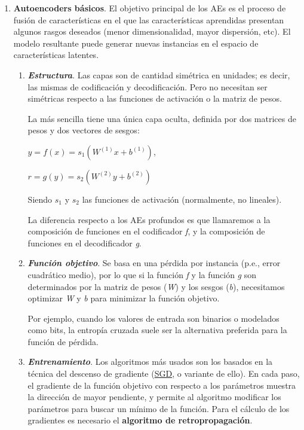 \begin{enumerate}
    \begin{enumerate}
        \item \textbf{Autoencoders básicos}. El objetivo principal de los AEs es el proceso de fusión de características en el que las características aprendidas presentan algunos rasgos deseados (menor dimensionalidad, mayor dispersión, etc). El modelo resultante puede generar nuevas instancias en el espacio de características latentes.
        \begin{enumerate}
            \item \textit{\textbf{Estructura}}. Las capas son de cantidad simétrica en unidades; es decir, las mismas de codificación y decodificación. Pero no necesitan ser simétricas respecto a las funciones de activación o la matriz de pesos.
            
            La más sencilla tiene una única capa oculta, definida por dos matrices de pesos y dos vectores de sesgos:
            \begin{center}
                $y = f(x) = s_{1} (W^{(1)}x + b^{(1)})$,
                
                $r = g (y) = s_{2} (W^{(2)}y + b^{(2)} )$
            \end{center}
            
            Siendo $s_{1}$ y $s_{2}$ las funciones de activación (normalmente, no lineales).
            
            La diferencia respecto a los AEs profundos es que llamaremos a la composición de funciones en el codificador \textit{f}, y la composición de funciones en el decodificador \textit{g}.
            
            \item \textit{\textbf{Función objetivo}}. Se basa en una pérdida por instancia (p.e., error cuadrático medio), por lo que si la función \textit{f} y la función \textit{g} son determinados por la matriz de pesos (\textit{W}) y los sesgos (\textit{b}), necesitamos optimizar \textit{W} y \textit{b} para minimizar la función objetivo.
            
            Por ejemplo, cuando los valores de entrada son
            binarios o modelados como bits, la entropía cruzada suele ser la alternativa preferida
            para la función de pérdida.
            \newpage
        
            \item \textit{\textbf{Entrenamiento}}. Los algoritmos más usados son los basados en la técnica del descenso de gradiente (\hyperlink{https://optimization.cbe.cornell.edu/index.php?title=Stochastic_gradient_descent}{SGD}, o variante de ello). En cada paso, el gradiente de la función objetivo con respecto a los parámetros muestra la dirección de mayor pendiente, y permite al algoritmo modificar los parámetros para buscar un mínimo de la función. Para el cálculo de los gradientes es necesario el \textbf{algoritmo de retropropagación}.
            

\end{enumerate}
\end{enumerate}
\end{enumerate}
